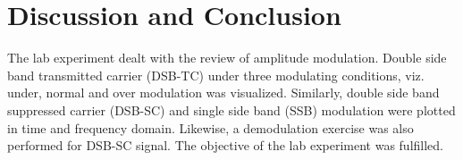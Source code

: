 \documentclass{lab_sheet}
\begin{document}
\section{Discussion and Conclusion}
The lab experiment dealt with the review of amplitude modulation. Double side band transmitted carrier (DSB-TC) under three modulating conditions, viz. under, normal and over modulation was visualized. Similarly, double side band suppressed carrier (DSB-SC) and single side band (SSB) modulation were plotted in time and frequency domain. Likewise, a demodulation exercise was also performed for DSB-SC signal. The objective of the lab experiment was fulfilled.
\end{document}
